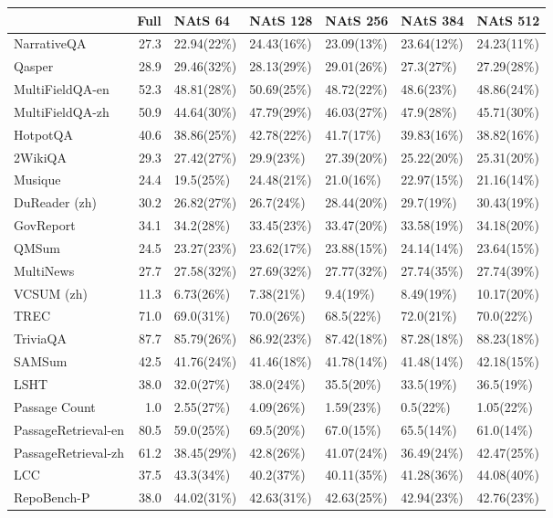 \begin{tabular}{lrlllll}
\toprule
 & Full & NAtS 64 & NAtS 128 & NAtS 256 & NAtS 384 & NAtS 512 \\
\midrule
NarrativeQA & 27.3 & 22.94(22\%) & 24.43(16\%) & 23.09(13\%) & 23.64(12\%) & 24.23(11\%) \\
Qasper & 28.9 & 29.46(32\%) & 28.13(29\%) & 29.01(26\%) & 27.3(27\%) & 27.29(28\%) \\
MultiFieldQA-en & 52.3 & 48.81(28\%) & 50.69(25\%) & 48.72(22\%) & 48.6(23\%) & 48.86(24\%) \\
MultiFieldQA-zh & 50.9 & 44.64(30\%) & 47.79(29\%) & 46.03(27\%) & 47.9(28\%) & 45.71(30\%) \\
HotpotQA & 40.6 & 38.86(25\%) & 42.78(22\%) & 41.7(17\%) & 39.83(16\%) & 38.82(16\%) \\
2WikiQA & 29.3 & 27.42(27\%) & 29.9(23\%) & 27.39(20\%) & 25.22(20\%) & 25.31(20\%) \\
Musique & 24.4 & 19.5(25\%) & 24.48(21\%) & 21.0(16\%) & 22.97(15\%) & 21.16(14\%) \\
DuReader (zh) & 30.2 & 26.82(27\%) & 26.7(24\%) & 28.44(20\%) & 29.7(19\%) & 30.43(19\%) \\
GovReport & 34.1 & 34.2(28\%) & 33.45(23\%) & 33.47(20\%) & 33.58(19\%) & 34.18(20\%) \\
QMSum & 24.5 & 23.27(23\%) & 23.62(17\%) & 23.88(15\%) & 24.14(14\%) & 23.64(15\%) \\
MultiNews & 27.7 & 27.58(32\%) & 27.69(32\%) & 27.77(32\%) & 27.74(35\%) & 27.74(39\%) \\
VCSUM (zh) & 11.3 & 6.73(26\%) & 7.38(21\%) & 9.4(19\%) & 8.49(19\%) & 10.17(20\%) \\
TREC & 71.0 & 69.0(31\%) & 70.0(26\%) & 68.5(22\%) & 72.0(21\%) & 70.0(22\%) \\
TriviaQA & 87.7 & 85.79(26\%) & 86.92(23\%) & 87.42(18\%) & 87.28(18\%) & 88.23(18\%) \\
SAMSum & 42.5 & 41.76(24\%) & 41.46(18\%) & 41.78(14\%) & 41.48(14\%) & 42.18(15\%) \\
LSHT & 38.0 & 32.0(27\%) & 38.0(24\%) & 35.5(20\%) & 33.5(19\%) & 36.5(19\%) \\
Passage Count & 1.0 & 2.55(27\%) & 4.09(26\%) & 1.59(23\%) & 0.5(22\%) & 1.05(22\%) \\
PassageRetrieval-en & 80.5 & 59.0(25\%) & 69.5(20\%) & 67.0(15\%) & 65.5(14\%) & 61.0(14\%) \\
PassageRetrieval-zh & 61.2 & 38.45(29\%) & 42.8(26\%) & 41.07(24\%) & 36.49(24\%) & 42.47(25\%) \\
LCC & 37.5 & 43.3(34\%) & 40.2(37\%) & 40.11(35\%) & 41.28(36\%) & 44.08(40\%) \\
RepoBench-P & 38.0 & 44.02(31\%) & 42.63(31\%) & 42.63(25\%) & 42.94(23\%) & 42.76(23\%) \\
\bottomrule
\end{tabular}
